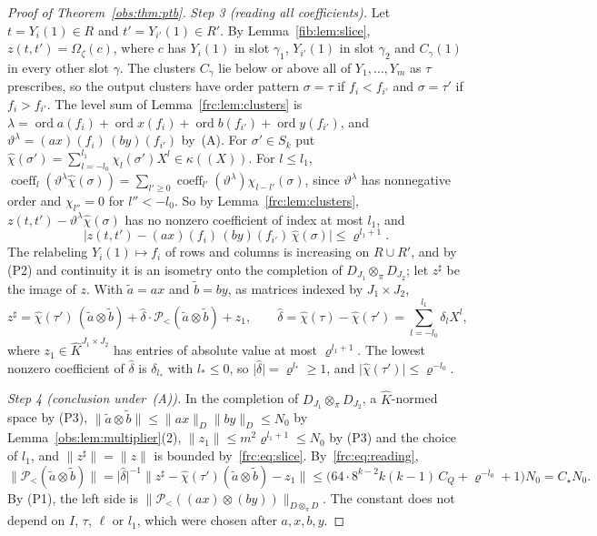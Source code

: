 \documentclass[11pt]{amsart}
\theoremstyle{definition}
\theoremstyle{remark}
\numberwithin{equation}{section}
\newcommand{\abs}[1]{\lvert #1\rvert}
\newcommand{\norm}[1]{\lVert #1\rVert}
\newcommand{\coeff}{\operatorname{coeff}}
\newcommand{\ord}{\operatorname{ord}}
\newcommand{\Kh}{\widehat K}
\theoremstyle{plain}
\theoremstyle{definition}
\theoremstyle{plain}
\newcommand{\cP}{\mathcal P}
\begin{document}
\begin{proof}[Proof of Theorem~\ref{obs:thm:ptb}]
\emph{Step 3 (reading all coefficients).} Let $t=Y_i(1)\in R$ and $t'=Y_{i'}(1)\in R'$. By Lemma~\ref{fib:lem:slice},
$z(t,t')=\Omega_\zeta(c)$, where $c$ has $Y_i(1)$ in slot $\gamma_1$, $Y_{i'}(1)$ in slot $\gamma_2$ and $C_\gamma(1)$ in
every other slot $\gamma$. The clusters $C_\gamma$ lie below or above all of $Y_1,\dots,Y_m$ as $\tau$ prescribes, so the
output clusters have order pattern $\sigma=\tau$ if $f_i<f_{i'}$ and $\sigma=\tau'$ if $f_i>f_{i'}$. The level sum of
Lemma~\ref{frc:lem:clusters} is $\lambda=\ord a(f_i)+\ord x(f_i)+\ord b(f_{i'})+\ord y(f_{i'})$, and
$\vartheta^\lambda=(ax)(f_i)\,(by)(f_{i'})$ by~(A). For $\sigma'\in S_k$ put
$\hat\chi(\sigma')=\sum_{l=-l_0}^{l_1}\chi_l(\sigma')X^l\in\kappa((X))$. For $l\le l_1$,
$\coeff_l(\vartheta^\lambda\hat\chi(\sigma))=\sum_{l'\ge0}\coeff_{l'}(\vartheta^\lambda)\chi_{l-l'}(\sigma)$, since
$\vartheta^\lambda$ has nonnegative order and $\chi_{l''}=0$ for $l''<-l_0$. So by Lemma~\ref{frc:lem:clusters},
$z(t,t')-\vartheta^\lambda\hat\chi(\sigma)$ has no nonzero coefficient of index at most $l_1$, and
\[
 \abs{z(t,t')-(ax)(f_i)\,(by)(f_{i'})\,\hat\chi(\sigma)}\le\varrho^{l_1+1}.
\]
The relabeling $Y_i(1)\mapsto f_i$ of rows and columns is increasing on $R\cup R'$, and by (P2) and continuity it is an
isometry onto the completion of $D_{J_1}\otimes_\pi D_{J_2}$; let $z^\sharp$ be the image of $z$. With $\tilde a=ax$ and
$\tilde b=by$, as matrices indexed by $J_1\times J_2$,
\begin{equation}\label{frc:eq:reading}
 z^\sharp=\hat\chi(\tau')\,(\tilde a\otimes\tilde b)+\hat\delta\cdot\cP_<(\tilde a\otimes\tilde b)+z_1,\qquad
 \hat\delta=\hat\chi(\tau)-\hat\chi(\tau')=\sum_{l=-l_0}^{l_1}\delta_lX^l,
\end{equation}
where $z_1\in\Kh^{J_1\times J_2}$ has entries of absolute value at most $\varrho^{l_1+1}$. The lowest nonzero coefficient
of $\hat\delta$ is $\delta_{l_*}$ with $l_*\le0$, so $\abs{\hat\delta}=\varrho^{l_*}\ge1$, and $\abs{\hat\chi(\tau')}\le\varrho^{-l_0}$.

\emph{Step 4 (conclusion under~(A)).} In the completion of $D_{J_1}\otimes_\pi D_{J_2}$, a $\Kh$\nobreakdash-normed space
by (P3), $\norm{\tilde a\otimes\tilde b}\le\norm{ax}_D\norm{by}_D\le N_0$ by Lemma~\ref{obs:lem:multiplier}(2),
$\norm{z_1}\le m^2\varrho^{l_1+1}\le N_0$ by (P3) and the choice of $l_1$, and $\norm{z^\sharp}=\norm z$ is bounded
by~\eqref{frc:eq:slice}. By~\eqref{frc:eq:reading},
\[
 \norm{\cP_<(\tilde a\otimes\tilde b)}=\abs{\hat\delta}^{-1}\norm{z^\sharp-\hat\chi(\tau')(\tilde a\otimes\tilde b)-z_1}
 \le\bigl(64\cdot8^{k-2}k(k-1)\,C_Q+\varrho^{-l_0}+1\bigr)N_0=C_\star N_0 .
\]
By (P1), the left side is $\norm{\cP_<((ax)\otimes(by))}_{D\otimes_\pi D}$. The constant does not depend on $I$, $\tau$,
$\ell$ or $l_1$, which were chosen after $a,x,b,y$.


\end{proof}
\end{document}
